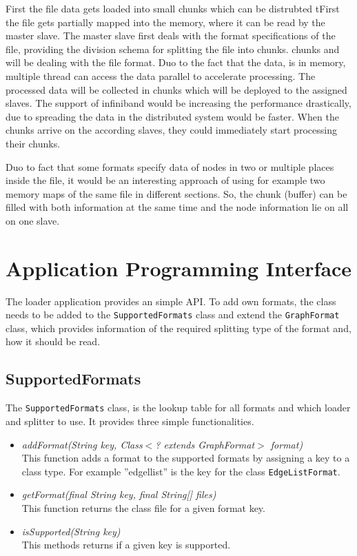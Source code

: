 First the file data gets loaded into small chunks which can be distrubted tFirst the file gets partially mapped into the memory, where it can be read by the master slave. The master slave first deals with the format specifications of the file, providing the division schema for splitting the file into chunks. chunks and will be dealing with the file format. Duo to the fact that the data, is in memory, multiple thread can access the data parallel to accelerate processing. The processed data will be collected in chunks which will be deployed to the assigned slaves.
The support of infiniband would be increasing the performance drastically, due to spreading the data in the distributed system would be faster.
When the chunks arrive on the according slaves, they could immediately start processing their chunks.
 
Duo to fact that some formats specify data of nodes in two or multiple places inside the file, it would be an interesting approach of using for example two memory maps of the same file in different sections. So, the chunk (buffer) can be filled with both information at the same time and the node information lie on all on one slave.

\section{Application Programming Interface}
The loader application provides an simple API. To add own formats, the class needs to be added to the \texttt{SupportedFormats} class and extend the \texttt{GraphFormat} class, which provides information of the required splitting type of the format and, how it should be read.
\subsection{SupportedFormats}
The \texttt{SupportedFormats} class, is the lookup table for all formats and which loader and splitter to use. It provides three simple functionalities.
\begin{itemize}
 \item[] \textit{addFormat(String key, Class$<$? extends GraphFormat$>$ format)}\\
 This function adds a format to the supported formats by assigning a key to a class type. For example ''{edgellist}'' is the key for the class \texttt{EdgeListFormat}.
 \item[] \textit{getFormat(final String key, final String[] files)}\\
 This function returns the class file for a given format key.
 \item[] \textit{isSupported(String key)}\\
This methods returns if a given key is supported.
\end{itemize}

